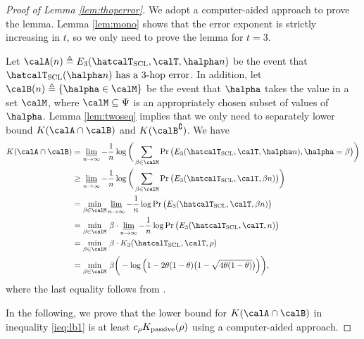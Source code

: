 \documentclass[11pt,onecolumn]{article}
\newcommand{\Passive}{{\rm passive}}
\begin{document}
\begin{proof}[Proof of Lemma \ref{lem:thoperror}]
	We adopt a computer-aided approach to prove the lemma. Lemma \ref{lem:mono} shows that the error exponent is strictly increasing in $t$, so we only need to prove the lemma for $t=3$. 
	
	Let $\calA(n)\triangleq E_{3}(\hatcalT_{{\rm SCL}},\calT,\halpha n)$ be the event that $\hatcalT_{\rm{SCL}}(\halpha n)\text{ has a }3\text{-hop error}$. In addition,   let $\calB(n)\triangleq\{\halpha \in \calM\}$ be the event that 
	$\halpha$ takes the value in a set $\calM$, where $\calM\subseteq \Psi$ is an appropriately chosen subset of values of $\halpha$. Lemma \ref{lem:twoseq} implies that we only need to separately lower bound $K(\calA\cap \calB)$ and $K (\calB^{\complement})$. We have
	\begin{align}
		K ( \calA\cap \calB)&=\varliminf_{n\rightarrow\infty}-\frac{1}{n}\log \bigg(\sum_{\beta\in \calM}\Pr\big(E_{3}(\hatcalT_{{\rm SCL}},\calT,\halpha n),\halpha=\beta\big)\bigg)\\
		&\geq \varliminf_{n\rightarrow\infty}-\frac{1}{n}\log \bigg(\sum_{\beta\in \calM}\Pr\big(E_{3}(\hatcalT_{{\rm SCL}},\calT,\beta n)\big)\bigg)\\
		&=\min_{\beta\in \calM}\varliminf_{n\rightarrow\infty}-\frac{1}{n}\log\Pr\big(E_{3}(\hatcalT_{{\rm SCL}},\calT,\beta n)\big)\\
		&=\min_{\beta\in \calM}\,\beta\cdot \varliminf_{n\rightarrow\infty}-\frac{1}{n}\log\Pr\big(E_{3}(\hatcalT_{{\rm SCL}},\calT,n)\big)\\
		&=\min_{\beta\in \calM}\,\beta \cdot K _{3}(\hatcalT_{{\rm SCL}},\calT,\rho)\\
		&=\min_{\beta\in \calM}\,\beta \bigg(-\log\Big(1-2\theta(1-\theta)\big(1-\sqrt{4\theta(1-\theta)}\big)\Big)\bigg), \label{ieq:lb1}
	\end{align}
	where the last equality follows from \cite[Lemma 1]{tandon2020exact}.

	In the following, we prove that the lower bound for $K ( \calA\cap \calB)$ in inequality \eqref{ieq:lb1} is at least $c_{\rho}K _{\Passive}(\rho)$ using a computer-aided approach.


\end{proof}
\end{document}
